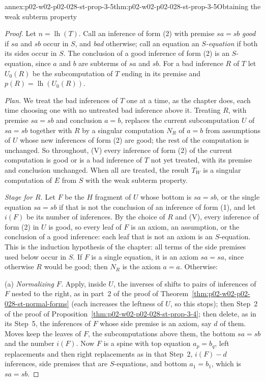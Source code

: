 \begin{annexitem}{annex:p02-w02-p02-028-st-prop-3-5}{thm:p02-w02-p02-028-st-prop-3-5}{Obtaining the weak subterm property}
\begin{proof}
Let \(n=\operatorname{lh}(T)\).  Call an inference of form (2) with premise
\(sa=sb\) \emph{good} if \(sa\) and \(sb\) occur in \(S\), and \emph{bad}
otherwise; call an equation an \emph{\(S\)-equation} if both its sides occur
in \(S\).  The conclusion of a good inference of form (2) is an
\(S\)-equation, since \(a\) and \(b\) are subterms of \(sa\) and \(sb\).
For a bad inference \(R\) of \(T\) let \(U_0(R)\) be the subcomputation of
\(T\) ending in its premise and \(p(R)=\operatorname{lh}(U_0(R))\).

\emph{Plan.}  We treat the bad inferences of \(T\) one at a time, as the
chapter does, each time choosing one with no untreated bad inference above
it.  Treating \(R\), with premise \(sa=sb\) and conclusion \(a=b\), replaces
the current subcomputation \(U\) of \(sa=sb\) together with \(R\) by a
singular computation \(N_R\) of \(a=b\) from assumptions of \(U\) whose new
inferences of form (2) are good; the rest of the computation is unchanged.
So throughout, (V) every inference of form (2) of the current computation is
good or is a bad inference of \(T\) not yet treated, with its premise and
conclusion unchanged.  When all are treated, the result \(T_W\) is a
singular computation of \(E\) from \(S\) with the weak subterm property.

\emph{Stage for \(R\).}  Let \(F\) be the \(H\) fragment of \(U\) whose
bottom is \(sa=sb\), or the single equation \(sa=sb\) if that is not the
conclusion of an inference of form (1), and let \(i(F)\) be its number of
inferences.  By the choice of \(R\) and (V), every inference of form (2) in
\(U\) is good, so every leaf of \(F\) is an axiom, an assumption, or the
conclusion of a good inference: each leaf that is not an axiom is an
\(S\)-equation.  This is the induction hypothesis of the chapter: all terms
of the side premises used below occur in \(S\).  If \(F\) is a single
equation, it is an axiom \(sa=sa\), since otherwise \(R\) would be good; then
\(N_R\) is the axiom \(a=a\).  Otherwise:

(a) \emph{Normalizing \(F\).}  Apply, inside \(U\), the inverses of shifts to
pairs of inferences of \(F\) nested to the right, as in part~2 of the proof
of Theorem~\ref{thm:p02-w02-p02-028-st-normal-forms} (each increases the
leftness of \(U\), so this stops); then Step~2 of the proof of
Proposition~\ref{thm:p02-w02-p02-028-st-prop-3-4}; then delete, as in its
Step~5, the inferences of \(F\) whose side premise is an axiom, say \(d\) of
them.  Moves keep the leaves of \(F\), the subcomputations above them, the
bottom \(sa=sb\) and the number \(i(F)\).  Now \(F\) is a spine with top
equation \(a_p=b_q\), left replacements and then right replacements as in
that Step~2, \(i(F)-d\) inferences, side premises that are \(S\)-equations,
and bottom \(a_1=b_1\), which is \(sa=sb\).


\end{proof}
\end{annexitem}
